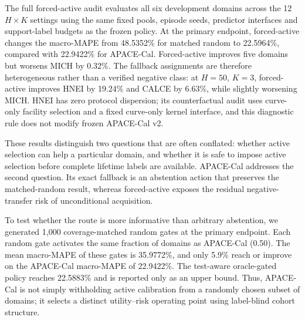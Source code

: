 \documentclass[preprint,12pt]{elsarticle}
\begin{document}
The full forced-active audit evaluates all six development domains across the 12 $H\times K$ settings using the same fixed pools, episode seeds, predictor interfaces and support-label budgets as the frozen policy. At the primary endpoint, forced-active changes the macro-MAPE from 48.5352\% for matched random to 22.5964\%, compared with 22.9422\% for APACE-Cal. Forced-active improves five domains but worsens MICH by 0.32\%. The fallback assignments are therefore heterogeneous rather than a verified negative class: at $H=50$, $K=3$, forced-active improves HNEI by 19.24\% and CALCE by 6.63\%, while slightly worsening MICH. HNEI has zero protocol dispersion; its counterfactual audit uses curve-only facility selection and a fixed curve-only kernel interface, and this diagnostic rule does not modify frozen APACE-Cal v2.

These results distinguish two questions that are often conflated: whether active selection can help a particular domain, and whether it is safe to impose active selection before complete lifetime labels are available. APACE-Cal addresses the second question. Its exact fallback is an abstention action that preserves the matched-random result, whereas forced-active exposes the residual negative-transfer risk of unconditional acquisition.

To test whether the route is more informative than arbitrary abstention, we generated 1,000 coverage-matched random gates at the primary endpoint. Each random gate activates the same fraction of domains as APACE-Cal (0.50). The mean macro-MAPE of these gates is 35.9772\%, and only 5.9\% reach or improve on the APACE-Cal macro-MAPE of 22.9422\%. The test-aware oracle-gated policy reaches 22.5883\% and is reported only as an upper bound. Thus, APACE-Cal is not simply withholding active calibration from a randomly chosen subset of domains; it selects a distinct utility--risk operating point using label-blind cohort structure.

\begin{table}[t]
\centering
\small
\caption{Policy-level utility--risk comparison at the prespecified primary endpoint ($H=50$, $K=3$). The oracle uses evaluation lifetimes and is not an implementable method.}
\label{tab:policy_risk}
%
\end{table}
\end{document}
